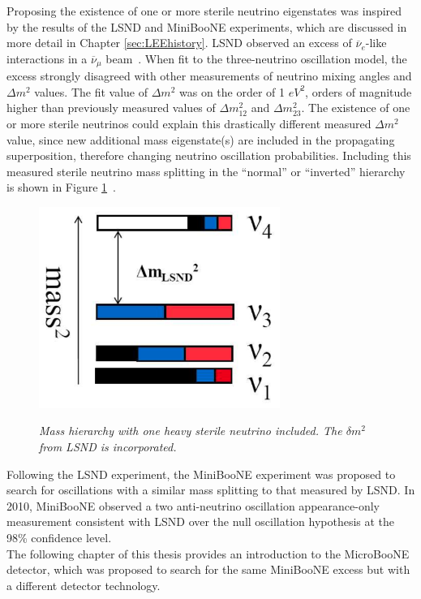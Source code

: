Proposing the existence of one or more sterile neutrino eigenstates was inspired by the results of the LSND and MiniBooNE experiments, which are discussed in more detail in Chapter \ref{sec:LEEhistory}. LSND observed an excess of $\overline{\nu}_e$-like interactions in a $\overline{\nu}_\mu$ beam~\cite{LSNDPaper}. When fit to the three-neutrino oscillation model, the excess strongly disagreed with other measurements of neutrino mixing angles and $\Delta m^2$ values. The fit value of $\Delta m^2$ was on the order of 1 $eV^2$, orders of magnitude higher than previously measured values of $\Delta m_{12}^2$ and $\Delta m_{23}^2$. The existence of one or more sterile neutrinos could explain this drastically different measured $\Delta m^2$ value, since new additional mass eigenstate(s) are included in the propagating superposition, therefore changing neutrino oscillation probabilities. Including this measured sterile neutrino mass splitting in the ``normal'' or ``inverted'' hierarchy is shown in Figure \ref{sterile_nu_hierarchy_fig}~\cite{GaryThesis}.\\

\begin{figure}[ht!]
\centering
	\includegraphics[width=0.7\textwidth]{Figures/sterile_masssplitting.png} \\
\caption{\textit{Mass hierarchy with one heavy sterile neutrino included. The $\delta m^2$ from LSND is incorporated.}}\label{sterile_nu_hierarchy_fig}
\end{figure}

Following the LSND experiment, the MiniBooNE experiment was proposed to search for oscillations with a similar mass splitting to that measured by LSND. In 2010, MiniBooNE observed a two anti-neutrino oscillation appearance-only measurement consistent with LSND over the null oscillation hypothesis at the 98\% confidence level.\\

The following chapter of this thesis provides an introduction to the MicroBooNE detector, which was proposed to search for the same MiniBooNE excess but with a different detector technology.
